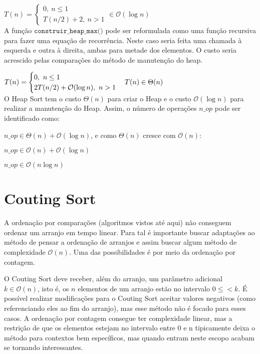 \documentclass[a4paper, twocolumn]{article}
\theoremstyle{definition}
\begin{document}
$T(n) = \begin{cases} 
	0, \ n \leq 1\\
	T(n/2) + 2, \ n > 1
\end{cases} \in \mathcal{O}(\log n)$ \\

A função $\texttt{construir\_heap\_max()}$ pode ser reformulada como uma função recursiva para fazer uma equação de recorrência. Neste caso seria feita uma chamada à esquerda e outra à direita, ambas para metade dos elementos. O custo seria acrescido pelas comparações do método de manutenção do heap.

$T(n) = \begin{cases} 
	0, \ n \leq 1\\
	2T(n/2) + \mathcal{O}(\log n), \ n > 1
\end{cases} \\ T(n) \in \Theta(n)$ \\

O Heap Sort tem o custo $\Theta(n)$ para criar o Heap e o custo $\mathcal{O}(\log n)$ para realizar a manutenção do Heap. Assim, o número de operações $n\_op$ pode ser identificado como:

$n\_op \in \Theta(n) + \mathcal{O}(\log n)$, e como $\Theta(n)$ cresce com $\mathcal{O}(n)$:

$n\_op \in \mathcal{O}(n) + \mathcal{O}(\log n)$

$n\_op \in \mathcal{O}(n \log n)$


\section{Couting Sort}
A ordenação por comparações (algoritmos vistos até aqui) não conseguem ordenar um arranjo em tempo linear. Para tal é importante buscar adaptações ao método de pensar a ordenação de arranjos e assim buscar algum método de complexidade $\mathcal{O}(n)$. Uma das possibilidades é por meio da ordenação por contagem.

O Couting Sort deve receber, além do arranjo, um parâmetro adicional $k \in \mathcal{O}(n)$, isto é, os $n$ elementos de um arranjo estão no intervalo $0 \leq < k$. É possível realizar modificações para o Couting Sort aceitar valores negativos (como referenciando eles ao fim do arranjo), mas esse método não é focado para esses casos. A ordenação por contagem consegue ter complexidade linear, mas a restrição de que os elementos estejam no intervalo entre 0 e n tipicamente deixa o método para contextos bem específicos, mas quando entram neste escopo acabam se tornando interessantes. 
\end{document}

